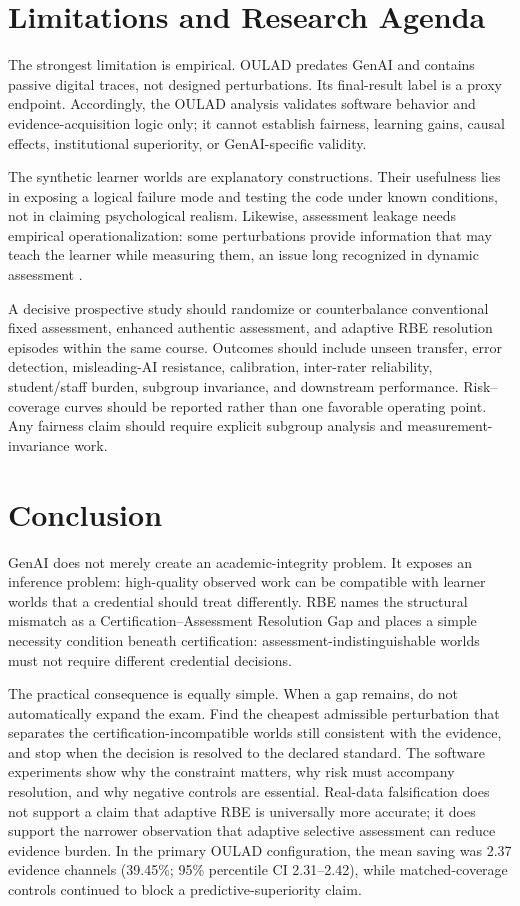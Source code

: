 \documentclass[11pt]{article}
\begin{document}
\section{Limitations and Research Agenda}
The strongest limitation is empirical. OULAD predates GenAI and contains passive digital traces, not designed perturbations. Its final-result label is a proxy endpoint. Accordingly, the OULAD analysis validates software behavior and evidence-acquisition logic only; it cannot establish fairness, learning gains, causal effects, institutional superiority, or GenAI-specific validity.

The synthetic learner worlds are explanatory constructions. Their usefulness lies in exposing a logical failure mode and testing the code under known conditions, not in claiming psychological realism. Likewise, assessment leakage needs empirical operationalization: some perturbations provide information that may teach the learner while measuring them, an issue long recognized in dynamic assessment \parencite{allal2000zpd,poehner2011validity}.

A decisive prospective study should randomize or counterbalance conventional fixed assessment, enhanced authentic assessment, and adaptive RBE resolution episodes within the same course. Outcomes should include unseen transfer, error detection, misleading-AI resistance, calibration, inter-rater reliability, student/staff burden, subgroup invariance, and downstream performance. Risk--coverage curves should be reported rather than one favorable operating point. Any fairness claim should require explicit subgroup analysis and measurement-invariance work.

\section{Conclusion}
GenAI does not merely create an academic-integrity problem. It exposes an inference problem: high-quality observed work can be compatible with learner worlds that a credential should treat differently. RBE names the structural mismatch as a Certification--Assessment Resolution Gap and places a simple necessity condition beneath certification: assessment-indistinguishable worlds must not require different credential decisions.

The practical consequence is equally simple. When a gap remains, do not automatically expand the exam. Find the cheapest admissible perturbation that separates the certification-incompatible worlds still consistent with the evidence, and stop when the decision is resolved to the declared standard. The software experiments show why the constraint matters, why risk must accompany resolution, and why negative controls are essential. Real-data falsification does not support a claim that adaptive RBE is universally more accurate; it does support the narrower observation that adaptive selective assessment can reduce evidence burden. In the primary OULAD configuration, the mean saving was 2.37 evidence channels (39.45\%; 95\% percentile CI 2.31--2.42), while matched-coverage controls continued to block a predictive-superiority claim.
\end{document}
